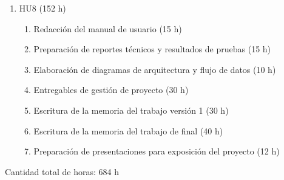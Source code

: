 \documentclass[
11pt, %
]{charter}
\begin{document}
\begin{enumerate}
\item HU8 (152 h)
\begin{enumerate}
\item Redacción del manual de usuario (15 h)
\item Preparación de reportes técnicos y resultados de pruebas (15 h)
\item Elaboración de diagramas de arquitectura y flujo de datos (10 h)
\item Entregables de gestión de proyecto (30 h)
\item Escritura de la memoria del trabajo versión 1 (30 h)
\item Escritura de la memoria del trabajo de final  (40 h)
\item Preparación de presentaciones para exposición del proyecto (12 h)
\end{enumerate}
\end{enumerate}

Cantidad total de horas: 684 h
\end{document}
